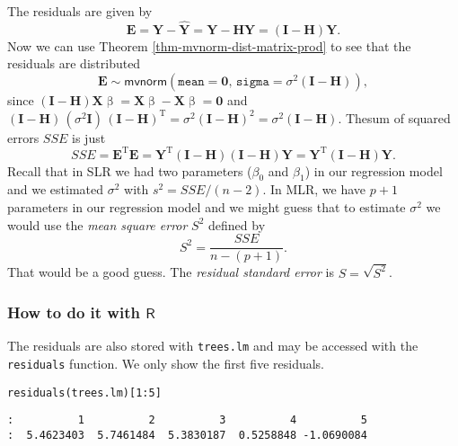 The residuals are given by
\begin{equation}
\mathbf{E}=\mathbf{Y}-\hat{\mathbf{Y}}=\mathbf{Y}-\mathbf{H}\mathbf{Y}=(\mathbf{I}-\mathbf{H})\mathbf{Y}.
\end{equation}
Now we can use Theorem \ref{thm-mvnorm-dist-matrix-prod} to see that the
residuals are distributed
\begin{equation}
\mathbf{E}\sim\mathsf{mvnorm}(\mathtt{mean}=\mathbf{0},\,\mathtt{sigma}=\sigma^{2}(\mathbf{I}-\mathbf{H})),
\end{equation}
since
\((\mathbf{I}-\mathbf{H})\mathbf{X}\upbeta=\mathbf{X}\upbeta-\mathbf{X}\upbeta=\mathbf{0}\)
and
\((\mathbf{I}-\mathbf{H})\,(\sigma^{2}\mathbf{I})\,(\mathbf{I}-\mathbf{H})^{\mathrm{T}}=\sigma^{2}(\mathbf{I}-\mathbf{H})^{2}=\sigma^{2}(\mathbf{I}-\mathbf{H})\). Thesum
of squared errors \(SSE\) is just
\begin{equation}
SSE=\mathbf{E}^{\mathrm{T}}\mathbf{E}=\mathbf{Y}^{\mathrm{T}}(\mathbf{I}-\mathbf{H})(\mathbf{I}-\mathbf{H})\mathbf{Y}=\mathbf{Y}^{\mathrm{T}}(\mathbf{I}-\mathbf{H})\mathbf{Y}.
\end{equation}
Recall that in SLR we had two parameters (\(\beta_{0}\) and
\(\beta_{1}\)) in our regression model and we estimated \(\sigma^{2}\)
with \(s^{2}=SSE/(n-2)\). In MLR, we have \(p+1\) parameters in our
regression model and we might guess that to estimate \(\sigma^{2}\) we
would use the \emph{mean square error} \(S^{2}\) defined by
\begin{equation}
S^{2}=\frac{SSE}{n-(p+1)}.
\end{equation}
That would be a good guess. The \emph{residual standard error} is
\(S=\sqrt{S^{2}}\).

\subsubsection{How to do it with \(\mathsf{R}\)}
\label{sec-12-2-3-1}

The residuals are also stored with \texttt{trees.lm} and may be accessed with
the \texttt{residuals} function. We only show the first five residuals.

\begin{verbatim}
residuals(trees.lm)[1:5]
\end{verbatim}

\begin{verbatim}
:          1          2          3          4          5 
:  5.4623403  5.7461484  5.3830187  0.5258848 -1.0690084
\end{verbatim}

